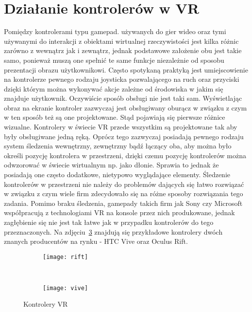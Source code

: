 \section{Działanie kontrolerów w VR}
\label{sec:kontroleryVR}
Pomiędzy kontrolerami typu gamepad. używanych do gier wideo oraz tymi używanymi do interakcji z obiektami wirtualnej rzeczywistości jest kilka różnic zarówno z wewnątrz jak i zewnątrz, jednak podstawowe założenie obu jest takie samo, ponieważ muszą one spełnić te same funkcje niezależnie od sposobu prezentacji obrazu użytkownikowi. Często spotykaną praktyką jest umiejscowienie na kontrolerze pewnego rodzaju joysticka pozwalającego na ruch oraz przyciski dzięki którym można wykonywać akcje zależne od środowiska w jakim się znajduje użytkownik. Oczywiście sposób obsługi nie jest taki sam. Wyświetlając obraz na ekranie kontroler zazwyczaj jest obsługiwany oburącz w związku z czym w ten sposób też są one projektowane. Stąd pojawiają się pierwsze różnice wizualne. Kontrolery w świecie VR przede wszystkim są projektowane tak aby były obsługiwane jedną ręką. Oprócz tego zazwyczaj posiadają pewnego rodzaju system śledzenia wewnętrzny, zewnętrzny bądź łączący oba, aby można było określi pozycję kontrolera w przestrzeni, dzięki czemu pozycję kontrolerów można odwzorować w świecie wirtualnym np. jako dłonie. Sprawia to jednak że posiadają one często dodatkowe, nietypowo wyglądające elementy. Śledzenie kontrolerów w przestrzeni nie należy do problemów dających się łatwo rozwiązać w związku z czym wiele firm zdecydowało się na różne sposoby rozwiązania tego zadania. Pomimo braku śledzenia, gamepady takich firm jak Sony czy Microsoft współpracują z technologiami VR na konsole przez nich produkowane, jednak zagłębienie się nie jest tak łatwe jak w przypadku kontrolerów do tego przeznaczonych. Na zdjęciu~\ref{fig:kontrolery} znajdują się przykładowe kontrolery dwóch znanych producentów na rynku - HTC Vive oraz Oculus Rift.
\begin{figure}[h]
\centering
	\begin{subfigure}[b]{0.45\textwidth}
	\texttt{[image: rift]}
	\label{fig:ctrlRift}
	\end{subfigure}
	~
	\begin{subfigure}[b]{0.45\textwidth}
	\texttt{[image: vive]}
	\label{fig:ctrlVive}
	\end{subfigure}
\caption{Kontrolery VR}
\label{fig:kontrolery}
\end{figure}
